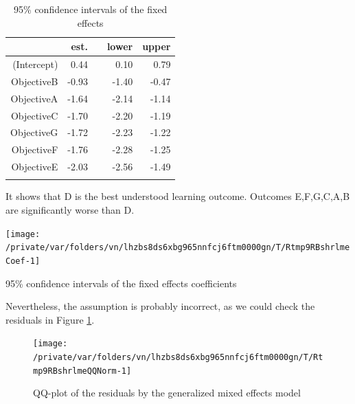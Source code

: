 \documentclass[12pt,english,nohyper]{tufte-handout}\usepackage[]{graphicx}\usepackage[]{color}
\newenvironment{knitrout}{}{} %
\begin{document}
\begin{longtable}{rrlrr}
  \hline
 & est. &    & lower & upper \\ 
  \hline
(Intercept) & 0.44 &  & 0.10 & 0.79 \\ 
  ObjectiveB & -0.93 &  & -1.40 & -0.47 \\ 
  ObjectiveA & -1.64 &  & -2.14 & -1.14 \\ 
  ObjectiveC & -1.70 &  & -2.20 & -1.19 \\ 
  ObjectiveG & -1.72 &  & -2.23 & -1.22 \\ 
  ObjectiveF & -1.76 &  & -2.28 & -1.25 \\ 
  ObjectiveE & -2.03 &  & -2.56 & -1.49 \\ 
   \hline
\hline
\caption{95\% confidence intervals of the fixed effects} 
\label{tab:lme_fixed}
\end{longtable}


It shows that D is the best understood learning outcome.
Outcomes E,F,G,C,A,B are
significantly worse than D.



\begin{knitrout}
\color{fgcolor}\begin{marginfigure}
\texttt{[image: /private/var/folders/vn/lhzbs8ds6xbg965nnfcj6ftm0000gn/T/Rtmp9RBshrlmeCoef-1]} \caption[95\% confidence intervals of the fixed effects coefficients]{95\% confidence intervals of the fixed effects coefficients}\label{mar:lmeCoef}
\end{marginfigure}


\end{knitrout}

Nevertheless, the assumption is probably incorrect, as we could check the residuals in
Figure \ref{fig:lmeQQNorm}.

\begin{knitrout}
\color{fgcolor}\begin{figure}

{\centering \texttt{[image: /private/var/folders/vn/lhzbs8ds6xbg965nnfcj6ftm0000gn/T/Rtmp9RBshrlmeQQNorm-1]} 

}

\caption[QQ-plot of the residuals by the generalized mixed effects model]{QQ-plot of the residuals by the generalized mixed effects model}\label{fig:lmeQQNorm}
\end{figure}


\end{knitrout}
\end{document}
